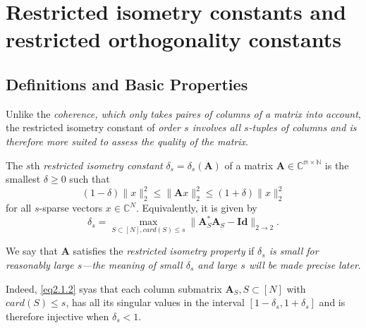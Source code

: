 \chapter{Restricted isometry constants and restricted orthogonality constants}
\section{Definitions and Basic Properties}
Unlike the \emph{\textcolor[rgb]{1,0,0}{coherence, which only takes paires of columns of a matrix into account}}, the restricted isometry constant of \emph{\textcolor[rgb]{1,0,0}{order $s$ involves all $s$-tuples of columns and is therefore more suited to assess the quality of the matrix}}.

\begin{definition}
    \label{def2.1.1}
    The $s$th \emph{restricted isometry constant} $\delta_s = \delta_s(\mathbf{A})$ of a matrix $\mathbf{A} \in \mathbb{C^{m \times N}}$ is the smallest $\delta \geq 0$ such that
    \begin{equation}
        (1-\delta)\|x\|^2_2 \leq \|\mathbf{A}x\|_2^2 \leq (1+\delta)\|x\|^2_2
        \label{eq2.1.1}
    \end{equation}
    for all $s$-sparse vectors $x \in \mathbb{C}^N$. Equivalently, it is given by
    \begin{equation}
        \delta_s = \max\limits_{S \subset [N], card(S) \leq s} \|\mathbf{A}^*_S \mathbf{A}_S - \mathbf{Id}\|_{2 \rightarrow 2}.
        \label{eq2.1.2}
    \end{equation}
\end{definition}

We say that $\mathbf{A}$ satisfies the \emph{restricted isometry property} if \emph{\textcolor[rgb]{1,0,0}{$\delta_s$ is small for reasonably large $s$---the meaning of small $\delta_s$ and large $s$ will be made precise later}}.

Indeed, \cref{eq2.1.2} syas that each column submatrix $\mathbf{A}_S, S \subset [N]$ with $card(S) \leq s$, has all its singular values in the interval $[1-\delta_s,1+\delta_s]$ and is therefore injective when $\delta_s < 1$.

